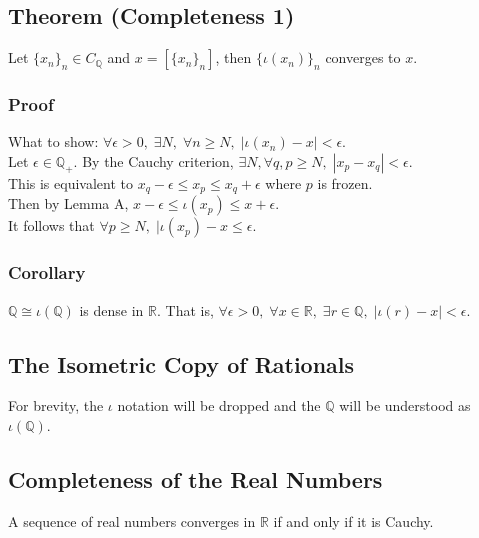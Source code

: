\documentclass[11pt]{article}
\newcommand{\0}{\emptyset}
\newcommand{\Q}{\mathbb{Q}}
\newcommand{\R}{\mathbb{R}}
\begin{document}
\subsection*{Theorem (Completeness 1)}
\label{sec:orga7694d0}
Let \(\{x_{n}\}_{n}\in C_{\Q}\) and \(x=[\{x_{n}\}_{n}]\), then \(\{\iota(x_{n})\}_{n}\) converges to \(x\).\\[0pt]
\subsubsection*{Proof}
\label{sec:orgb02e97e}
What to show: \(\forall\epsilon>0,\;\exists N,\;\forall n\geq N,\;|\iota(x_{n})-x|<\epsilon\).\\[0pt]
Let \(\epsilon\in\Q_{+}\). By the Cauchy criterion, \(\exists N,\forall q,p\geq N,\;|x_{p}-x_{q}|<\epsilon\).\\[0pt]
This is equivalent to \(x_{q}-\epsilon\leq x_{p}\leq x_{q}+\epsilon\) where \(p\) is frozen.\\[0pt]
Then by Lemma A, \(x-\epsilon\leq \iota(x_{p})\leq x+\epsilon\).\\[0pt]
It follows that \(\forall p\geq N,\;|\iota(x_{p})-x\leq\epsilon\).\\[0pt]
\subsubsection*{Corollary}
\label{sec:org6a4090a}
\(\Q\cong\iota(\Q)\) is dense in \(\R\). That is, \(\forall\epsilon>0,\;\forall x\in\R,\;\exists r\in\Q,\;|\iota(r)-x|<\epsilon\).\\[0pt]
\subsection*{The Isometric Copy of Rationals}
\label{sec:org1734b33}
For brevity, the \(\iota\) notation will be dropped and the \(\Q\) will be understood as \(\iota(\Q)\).\\[0pt]
\subsection*{Completeness of the Real Numbers}
\label{sec:orgc1da621}
A sequence of real numbers converges in \(\R\)  if and only if it is Cauchy.\\[0pt]
\end{document}
